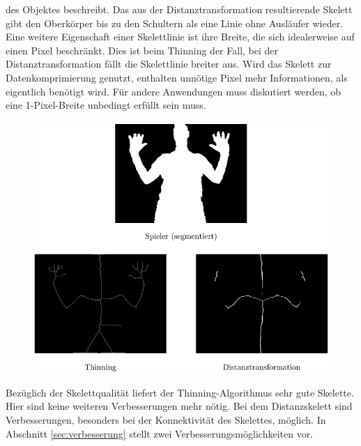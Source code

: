 des Objektes beschreibt. Das aus der Distanztransformation resultierende Skelett gibt den Oberkörper bis
zu den Schultern als eine Linie ohne Ausläufer wieder.\\
Eine weitere Eigenschaft einer Skelettlinie ist ihre Breite, die sich idealerweise auf einen Pixel beschränkt. Dies ist beim Thinning der Fall, bei der Distanztransformation fällt die Skelettlinie breiter
aus. Wird das Skelett zur Datenkomprimierung genutzt, enthalten unnötige Pixel mehr Informationen, als 
eigentlich benötigt wird. Für andere Anwendungen muss diskutiert werden, ob eine 1-Pixel-Breite unbedingt erfüllt sein muss.\\
\begin{figure}[htbp]
\centering
\includegraphics[width=1.0\linewidth]{./fig/vergleich-screenshot12}
\caption{}
\label{fig:vergleich-screenshot12}
\end{figure}
Bezüglich der Skelettqualität liefert der Thinning-Algorithmus sehr
gute Skelette. Hier sind keine weiteren Verbesserungen mehr nötig.
Bei dem Distanzskelett sind Verbesserungen, besonders bei der 
Konnektivität des Skelettes, möglich. In Abschnitt \ref{sec:verbesserung} stellt zwei Verbesserungsmöglichkeiten vor.
